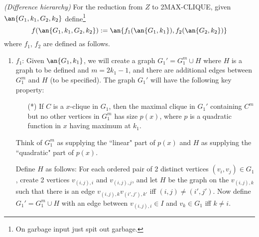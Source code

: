 \begin{problem}{\it(Difference hierarchy)}
For the reduction from $Z$ to 2MAX-CLIQUE, given $\an{G_1,k_1,G_2,k_2}$ define\footnote{On garbage input just spit out garbage.}
\[f(\an{G_1,k_1,G_2,k_2}):=
\an{f_1(\an{G_1,k_1}),f_2(\an{G_2,k_2})}\]
where $f_1$, $f_2$ are defined as follows.
\begin{enumerate}
\item
$f_1$: 
Given $\an{G_1,k_1}$, we will create a graph %
$G_1'=G_1^m\cup H$ where $H$ is a graph to be defined and $m=2k_1-1$, and there are additional edges between $G_1^m$ and $H$ (to be specified). The graph $G_1'$ will have the following key property: 
\begin{enumerate}
\item[(*)]
If %
$C$ is a $x$-clique in $G_1$, then the maximal clique in $G_1'$ containing $C^m$ but no other vertices in $G_1^m$ has size $p(x)$, where $p$ is a quadratic function in $x$ having maximum at $k_1$.
\end{enumerate}

Think of $G_1^m$ as supplying the ``linear" part of $p(x)$ and $H$ as supplying the ``quadratic" part of $p(x)$.

Define $H$ as follows: 
For each ordered pair of 2 distinct vertices $(v_i,v_j)\in G_1$, create 2 vertices $v_{(i,j),i}$ and $v_{(i,j),j}$, and let $H$ be the graph on the $v_{(i,j),k}$ such that there is an edge $v_{(i,j),k}v_{(i',j'),k'}$ iff $(i,j)\ne (i',j')$.
Now define $G_1'=G_1^m\cup H$ with %
an edge between $v_{(i,j),i}\in I$ and $v_k\in G_1$ iff $k\ne i$.


\end{enumerate}
\end{problem}

